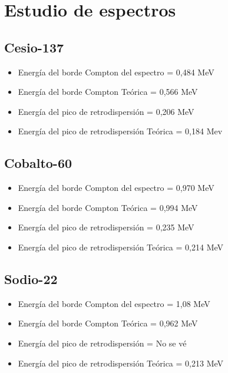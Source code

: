 \documentclass[a4paper,12pt,spanish]{article}
\begin{document}
\vspace{\baselineskip}
	
	
	
	
	\section{Estudio de espectros}
	
	\subsection*{Cesio-137}
	
	\begin{itemize}
		\item Energía del borde Compton del espectro = 0,484 MeV
		\item Energía del borde Compton Teórica = 0,566 MeV
		\item Energía del pico de retrodispersión = 0,206 MeV
		\item Energía del pico de retrodispersión Teórica = 0,184 Mev
	\end{itemize}
	
	\subsection*{Cobalto-60}
	
	\begin{itemize}
		\item Energía del borde Compton del espectro = 0,970 MeV
		\item Energía del borde Compton Teórica = 0,994 MeV
		\item Energía del pico de retrodispersión = 0,235 MeV
		\item Energía del pico de retrodispersión Teórica = 0,214 MeV
	\end{itemize}
	
	
	\subsection*{Sodio-22}
	\begin{itemize}
		\item Energía del borde Compton del espectro = 1,08 MeV
		\item Energía del borde Compton Teórica = 0,962 MeV
		\item Energía del pico de retrodispersión = No se vé
		\item Energía del pico de retrodispersión Teórica = 0,213 MeV
	\end{itemize}
\end{document}
